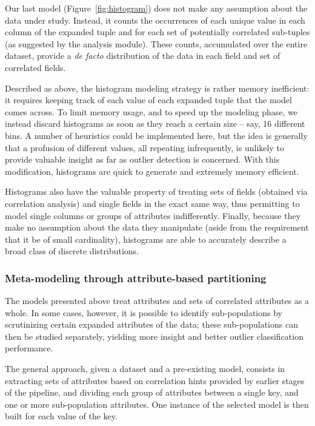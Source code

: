 Our last model (Figure~\ref{fig:histogram}) does not make any assumption about the data under study. Instead, it counts the occurrences of each unique value in each column of the expanded tuple and for each set of potentially correlated sub-tuples (as suggested by the analysis module). These counts, accumulated over the entire dataset, provide a \emph{de facto} distribution of the data in each field and set of correlated fields.

Described as above, the histogram modeling strategy is rather memory inefficient: it requires keeping track of each value of each expanded tuple that the model comes across. To limit memory usage, and to speed up the modeling phase, we instead discard histograms as soon as they reach a certain size -- say, 16 different bins. A number of heuristics could be implemented here, but the idea is generally that a profusion of different values, all repeating infrequently, is unlikely to provide valuable insight as far as outlier detection is concerned. With this modification, histograms are quick to generate and extremely memory efficient.

Histograms also have the valuable property of treating sets of fields (obtained via correlation analysis) and single fields in the exact same way, thus permitting to model single columns or groups of attributes indifferently. Finally, because they make no assumption about the data they manipulate (aside from the requirement that it be of small cardinality), histograms are able to accurately describe a broad class of discrete distributions.

\subsubsection{Meta-modeling through attribute-based partitioning}
\label{sec:partitioning}

The models presented above treat attributes and sets of correlated attributes as a whole. In some cases, however, it is possible to identify sub-populations by scrutinizing certain expanded attributes of the data; these sub-populations can then be studied separately, yielding more insight and better outlier classification performance.

The general approach, given a dataset and a pre-existing model, consists in extracting sets of attributes based on correlation hints provided by earlier stages of the pipeline, and dividing each group of attributes between a single key, and one or more sub-population attributes. One instance of the selected model is then built for each value of the key.

